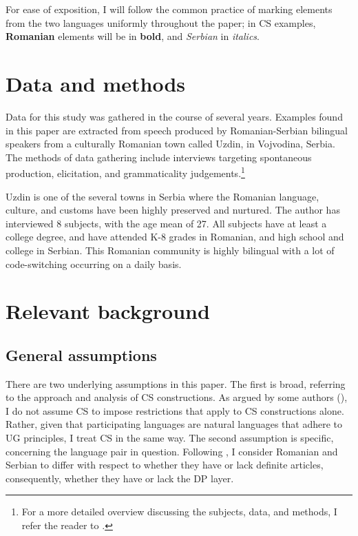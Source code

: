 \documentclass[output=paper,
hidelinks,
newtxmath,
]{langscibook}
\begin{document}
For ease of exposition, I will follow the common practice of marking elements from the two languages uniformly throughout the paper; in CS examples, \textbf{Romanian} elements will be in \textbf{bold}, and \textit{Serbian} in \textit{italics}.

\section{Data and methods}\label{s2}

Data for this study was gathered in the course of several years. Examples found in this paper are extracted from speech produced by Romanian-Serbian bilingual speakers from a culturally Romanian town called Uzdin, in Vojvodina, Serbia. The methods of data gathering include interviews targeting spontaneous production, elicitation, and grammaticality judgements.\footnote{For a more detailed overview discussing the subjects, data, and methods, I refer the reader to \citet{Petroj}.} 

Uzdin is one of the several towns in Serbia where the Romanian language, culture, and customs have been highly preserved and nurtured. The author has interviewed 8 subjects, with the age mean of 27. All subjects have at least a college degree, and have attended K-8 grades in Romanian, and high school and college in Serbian. This Romanian community is highly bilingual with a lot of code-switching occurring on a daily basis.

\section{Relevant background}\label{s3}
\subsection{General assumptions}\label{s3.1}

There are two underlying assumptions in this paper. The first is broad, referring to the approach and analysis of CS constructions. As argued by some authors (\citealt{GonzalesVelasquez1995,Bhatia-Ritchie1996,denDikken2011,BandiRao-denDikken2014}), I do not assume CS to impose restrictions that apply to CS constructions alone. Rather, given that participating languages are natural languages that adhere to UG principles, I treat CS in the same way. The second assumption is specific, concerning the language pair in question. Following \citet{Boskovic2008,Boskovic2012}, I consider Romanian and Serbian to differ with respect to whether they have or lack definite articles, consequently, whether they have or lack the DP layer.
\end{document}
